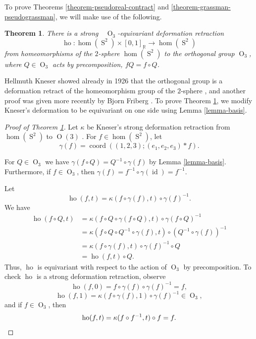 \documentclass[JEP,XML,SOM,Unicode,NoFloatCountersInSection,published]{cedram}
\newtheorem{theorem}{Theorem}[subsection]
\theoremstyle{remark}
\let\mb\mathbb
\DeclareMathOperator{\orth}{O}
\DeclareMathOperator{\sphere}{S}
\DeclareMathOperator{\coord}{coord}
\DeclareMathOperator{\ho}{ho}
\DeclareMathOperator{\id}{id}
\begin{document}
To prove Theorems \ref{theorem-pseudoreal-contract} and \ref{theorem-grassman-pseudograssman}, we will make use of the following.

\begin{theorem}\label{theorem-kneser-equivariant}
There is a strong\ ~$\orth_3$-equivariant deformation retraction
\[\ho : \hom(\sphere^2) \times [0,1]_\mb{R} \to \hom(\sphere^2)\]
from homeomorphisms of the $2$-sphere $\hom(\sphere^2)$ to the orthogonal group $\orth_3$,
where $Q \in \orth_3$ acts by precomposition, \ie $fQ = f \circ Q$.
\end{theorem}

Hellmuth Kneser showed already in 1926 that the orthogonal group is a deformation retract of the homeomorphism group of the $2$-sphere \cite{kneser1926deformationssatze}, and another proof was given more recently by Bjorn Friberg \cite{friberg1973topological}.
To prove Theorem \ref{theorem-kneser-equivariant}, we modify Kneser's deformation to be equivariant on one side using Lemma \ref{lemma-basis}.

\begin{proof}[Proof of Theorem \ref{theorem-kneser-equivariant}]
Let $\kappa$ be Kneser's strong deformation retraction from $\hom(\sphere^2)$ to $\orth(3)$ \cite{kneser1926deformationssatze}.
For $f \in \hom(\sphere^2)$, let
\[ \gamma(f) = \coord((1,2,3);(e_1,e_2,e_3)*f). \]

For $Q \in \orth_3$ we have $\gamma(f\circ Q) = Q^{-1} \circ \gamma(f)$ by Lemma \ref{lemma-basis}. Furthermore, if $f \in \orth_3$, then $\gamma(f) = f^{-1} \circ \gamma(\id) = f^{-1}$.

Let
\[ \ho(f,t) = \kappa(f \circ \gamma(f),t) \circ \gamma(f)^{-1}. \]
We have
\begin{align*}
\ho(f \circ Q,t)
&= \kappa(f \circ Q \circ \gamma(f \circ Q),t) \circ \gamma(f \circ Q)^{-1} \\
&= \kappa(f \circ Q \circ Q^{-1} \circ \gamma(f),t) \circ (Q^{-1} \circ \gamma(f))^{-1} \\
&= \kappa(f \circ \gamma(f),t) \circ \gamma(f)^{-1} \circ Q \\
&= \ho(f ,t) \circ Q.
\end{align*}
Thus, $\ho$ is equivariant with respect to the action of $\orth_3$ by precomposition.
To check $\ho$ is a strong deformation retraction, observe
\[\ho(f,0) = f \circ \gamma(f) \circ \gamma(f)^{-1} = f, \]
\[\ho(f,1) = \kappa(f \circ \gamma(f),1) \circ \gamma(f)^{-1} \in \orth_3, \]
and if $f \in \orth_3$, then
\[\ho(f,t) = \kappa(f \circ f^{-1},t) \circ f = f. \qedhere \]
\end{proof}
\end{document}
